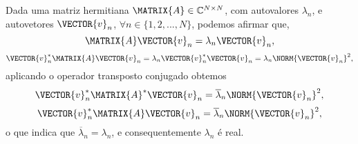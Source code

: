 \begin{myproofT}\label{proof:theo:autovalorhermitianmatrix0}
Dada uma matriz hermitiana $\MATRIX{A} \in \mathbb{C}^{N \times N}$, com  autovalores $\lambda_n$,
e autovetores $\VECTOR{v}_n$, $\forall n \in \{1, 2, ..., N\}$, podemos afirmar que,
\begin{equation}
\MATRIX{A}\VECTOR{v}_n=\lambda_n \VECTOR{v}_n,
\end{equation}
\begin{equation}
\VECTOR{v}_n^{\ast}\MATRIX{A}\VECTOR{v}_n=\lambda_n \VECTOR{v}_n^{\ast} \VECTOR{v}_n=\lambda_n \NORM{\VECTOR{v}_n}^2,
\end{equation}
aplicando o operador transposto conjugado obtemos
\begin{equation}
\VECTOR{v}_n^{\ast}\MATRIX{A}^{\ast}\VECTOR{v}_n=\overline{\lambda}_n \NORM{\VECTOR{v}_n}^2,
\end{equation}
\begin{equation}
\VECTOR{v}_n^{\ast}\MATRIX{A}\VECTOR{v}_n=\overline{\lambda}_n \NORM{\VECTOR{v}_n}^2,
\end{equation}
o que indica que $\overline{\lambda}_n=\lambda_n$, e consequentemente $\lambda_n$ é real.
\end{myproofT}

